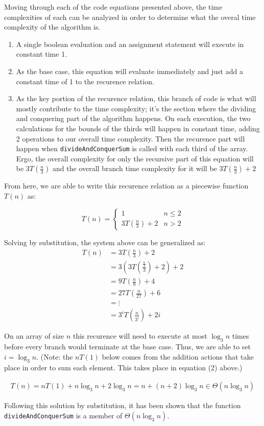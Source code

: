 \documentclass[12pt]{article}
\begin{document}
Moving through each of the code equations presented above, the time complexities of each can be analyzed in order to determine what the overal time complexity of the algorithm is.
\begin{enumerate}
    \item A single boolean evaluation and an assignment statement will execute in constant time 1.
    \item As the base case, this equation will evaluate immediately and just add a constant time of 1 to the recurence relation.
    \item As the key portion of the recurence relation, this branch of code is what will mostly contribute to the time complexity; it's the section where the dividing and conquering part of the algorithm happens. On each execution, the two calculations for the bounds of the thirds will happen in constant time, adding 2 operations to our overall time complexity. Then the recurence part will happen when \texttt{divideAndConquerSum} is called with each third of the array. Ergo, the overall complexity for only the recursive part of this equation will be $3T(\frac{n}{3})$ and the overall branch time complexity for it will be $3T(\frac{n}{3}) + 2$
\end{enumerate}

From here, we are able to write this recurence relation as a piecewise function $T(n)$ as:

\[ T(n) = \begin{cases}
    1 & n \leq 2 \\
    3T(\frac{n}{3}) + 2 & n > 2
\end{cases} \]

Solving by substitution, the system above can be generalized as:
\[ \begin{align}
    T(n) &= 3T(\frac{n}{3}) + 2 \\
    &= 3 (3T(\frac{\frac{n}{3}}{3}) + 2) + 2 \\
    &= 9T(\frac{n}{9}) + 4 \\
    &= 27T(\frac{n}{27}) + 6 \\
    &= \vdots \\
    &= 3^i T(\frac{n}{3^i}) + 2i
\end{align} \]

On an array of size $n$ this recurence will need to execute at most $\log_3 n$ times before every branch would terminate at the base case. Thus, we are able to set $i = \log_3 n$. (Note: the $nT(1)$ below comes from the addition actions that take place in order to sum each element. This takes place in equation (2) above.)

\[\begin{align}
    T(n) = nT(1) + n \log_3 n + 2 \log_3 n = n + (n + 2)\log_3 n \in \Theta(n \log_3 n)
\end{align}\]

Following this solution by substitution, it has been shown that the function \texttt{divideAndConquerSum} is a member of $\Theta(n \log_3 n)$.
\end{document}
